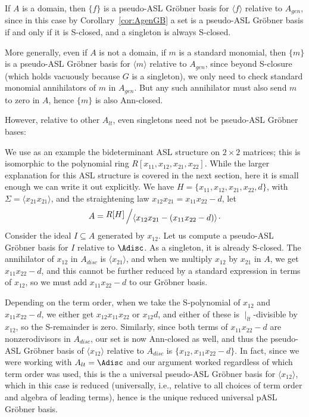 \documentclass[11pt,reqno]{amsart}
\newcommand{\bigslant}[2]{{\raisebox{.2em}{$#1$}\left/\raisebox{-.2em}{$#2$}\right.}}
\newcommand{\ltdivides}{\mid_{lt}}
\theoremstyle{definition}
\numberwithin{equation}{section}
\begin{document}
\begin{example}
If $A$ is a domain, then $\{ f\}$ is a pseudo-ASL Gröbner basis for $\langle f \rangle$ relative to $A_{gen}$, since in this case by Corollary~\ref{cor:AgenGB} a set is a pseudo-ASL Gröbner basis if and only if it is S-closed, and a singleton is always S-closed.

More generally, even if $A$ is not a domain, if $m$ is a standard monomial, then $\{ m \}$ is a pseudo-ASL Gröbner basis for $\langle m \rangle$ relative to $A_{gen}$, since beyond S-closure (which holds vacuously because $G$ is a singleton), we only need to check standard monomial annihilators of $m$ in $A_{gen}$. But any such annihilator must also send $m$ to zero in $A$, hence $\{m\}$ is also Ann-closed.
\end{example}

However, relative to other $A_{lt}$, even singletons need not be pseudo-ASL Gröbner bases:

\begin{example} \label{ex:singleton}
We use as an example the bideterminant ASL structure on $2 \times 2$ matrices; this is isomorphic to the polynomial ring $R[x_{11}, x_{12}, x_{21}, x_{22}]$. While the larger explanation for this ASL structure is covered in the next section, here it is small enough we can write it out explicitly. We have $H = \{x_{11}, x_{12}, x_{21}, x_{22}, d\}$, with $\Sigma = \langle x_{21}x_{21} \rangle$, and the straightening law $x_{12} x_{21} = x_{11} x_{22} - d$, let 
\[
A = \bigslant{R[H]}{\langle x_{12} x_{21} - (x_{11} x_{22}-d) \rangle}.
\]
Consider the ideal $I \subseteq A$ generated by $x_{12}$. Let us compute a pseudo-ASL Gröbner basis for $I$ relative to $\Adisc$. As a singleton, it is already S-closed. The annihilator of $x_{12}$ in $A_{disc}$ is $\langle x_{21} \rangle$, and when we multiply $x_{12}$ by $x_{21}$ in $A$, we get $x_{11} x_{22}-d$, and this cannot be further reduced by a standard expression in terms of $x_{12}$, so we must add $x_{11} x_{22} - d$ to our Gröbner basis.

Depending on the term order, when we take the S-polynomial of $x_{12}$ and $x_{11} x_{22} - d$, we either get $x_{12} x_{11} x_{22}$ or $x_{12} d$, and either of these is $\ltdivides$-divisible by $x_{12}$, so the S-remainder is zero. Similarly, since both terms of $x_{11} x_{22} - d$ are nonzerodivisors in $A_{disc}$, our set is now Ann-closed as well, and thus the pseudo-ASL Gröbner basis of $\langle x_{12} \rangle$ relative to $A_{disc}$ is $\{x_{12}, x_{11} x_{22} - d\}$. In fact, since we were working with $A_{lt} = \Adisc$ and our argument worked regardless of which term order was used, this is the a universal pseudo-ASL Gröbner basis for $\langle x_{12} \rangle$, which in this case is reduced (universally, i.e., relative to all choices of term order and algebra of leading terms), hence is the unique reduced universal pASL Gröbner basis.
\end{example}
\end{document}
